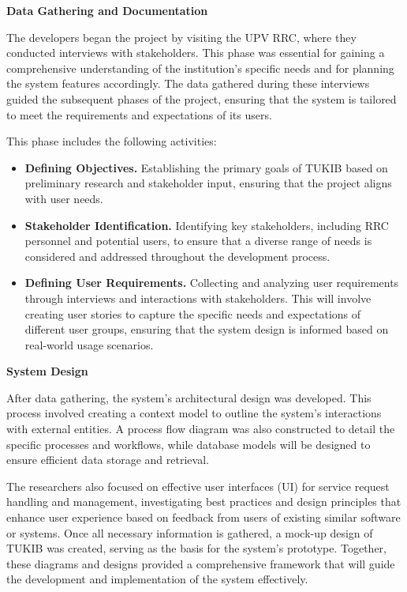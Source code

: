\textbf{Data Gathering and Documentation}

The developers began the project by visiting the UPV RRC, where they conducted interviews with stakeholders. This phase was essential for gaining a comprehensive understanding of the institution's specific needs and for planning the system features accordingly. The data gathered during these interviews guided the subsequent phases of the project, ensuring that the system is tailored to meet the requirements and expectations of its users. 

This phase includes the following activities:

\begin{itemize}
	\item \textbf{Defining Objectives.} Establishing the primary goals of TUKIB based on preliminary research and stakeholder input, ensuring that the project aligns with user needs.
	\item \textbf{Stakeholder Identification.} Identifying key stakeholders, including RRC personnel and potential users, to ensure that a diverse range of needs is considered and addressed throughout the development process.
	\item \textbf{Defining User Requirements.} Collecting and analyzing user requirements through interviews and interactions with stakeholders. This will involve creating user stories to capture the specific needs and expectations of different user groups, ensuring that the system design is informed based on real-world usage scenarios.
\end{itemize}

\textbf{System Design}

After data gathering, the system's architectural design was developed. This process involved creating a context model to outline the system's interactions with external entities. A process flow diagram was also constructed to detail the specific processes and workflows, while database models will be designed to ensure efficient data storage and retrieval. 

The researchers also focused on effective user interfaces (UI) for service request handling and management, investigating best practices and design principles that enhance user experience based on feedback from users of existing similar software or systems. Once all necessary information is gathered, a mock-up design of TUKIB was created, serving as the basis for the system's prototype. Together, these diagrams and designs provided a comprehensive framework that will guide the development and implementation of the system effectively.\newline

